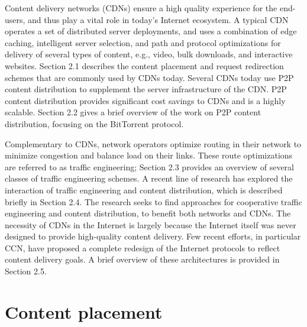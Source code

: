 
Content delivery networks (CDNs) ensure a high quality experience for the end-users, and thus play a vital role in today's Internet ecosystem.  A typical CDN  operates a set of distributed server deployments, and uses a combination of edge caching, intelligent server selection, and path and protocol optimizations for delivery of several types of content, e.g., video, bulk downloads, and interactive websites. Section 2.1 describes the content placement and request redirection schemes that are commonly used by CDNs today. Several CDNs today use P2P content distribution to supplement the server infrastructure of the CDN.  P2P content distribution provides significant cost savings to CDNs and is a highly scalable. Section 2.2 gives a brief overview of the work on P2P content distribution, focusing on the BitTorrent protocol.

Complementary to CDNs, network operators optimize routing in their network to minimize congestion and balance load on their links. These route optimizations are referred to as traffic engineering; Section 2.3 provides an overview of several classes of traffic engineering schemes. 
A recent line of research has explored the interaction of traffic engineering and content distribution, which is described briefly in Section 2.4. The research seeks to find approaches for cooperative traffic engineering and content distribution, to benefit both networks and CDNs. The necessity of CDNs in the Internet is largely because the Internet itself was never designed to provide high-quality content delivery. Few recent efforts, in particular CCN, have proposed a complete redesign of the Internet protocols to reflect content delivery goals. A brief overview of these architectures is provided in Section 2.5.












\section{Content placement}



